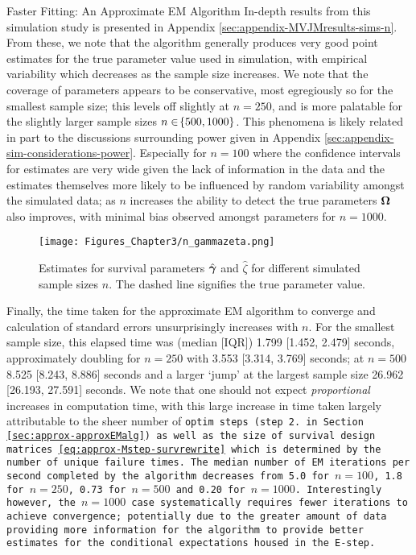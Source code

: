 \begin{chapter}{\label{cha:approx}Faster Fitting: An Approximate EM Algorithm}
  In-depth results from this simulation study is presented in Appendix \ref{sec:appendix-MVJMresults-sims-n}. From these, we note that the algorithm generally produces very good point estimates for the true parameter value used in simulation, with empirical variability which decreases as the sample size increases. We note that the coverage of parameters appears to be conservative, most egregiously so for the smallest sample size; this levels off slightly at $n=250$, and is more palatable for the slightly larger sample sizes $n\in\!\left\{500,1000\right\}$. This phenomena is likely related in part to the discussions surrounding power given in Appendix \ref{sec:appendix-sim-considerations-power}. Especially for $n=100$ where the confidence intervals for estimates are very wide given the lack of information in the data and the estimates themselves more likely to be influenced by random variability amongst the simulated data; as $n$ increases the ability to detect the true parameters $\bm{\mathrm{\Omega}}$ also improves, with minimal bias observed amongst parameters for $n=1000$.

  \begin{figure}[t]
      \centering
      \texttt{[image: Figures\_Chapter3/n\_gammazeta.png]}
      \caption{Estimates for survival parameters $\hat{\bm{\gamma}}$ and $\hat{\zeta}$ for different simulated sample sizes $n$. The dashed line signifies the true parameter value.}
      \label{fig:approx-sims-n}
  \end{figure}

  Finally, the time taken for the approximate EM algorithm to converge and calculation of standard errors unsurprisingly increases with $n$. For the smallest sample size, this elapsed time was (median [IQR]) 1.799 [1.452, 2.479] seconds, approximately doubling for $n=250$ with 3.553 [3.314, 3.769] seconds; at $n=500$ 8.525 [8.243, 8.886] seconds and a larger `jump' at the largest sample size 26.962 [26.193, 27.591] seconds. We note that one should not expect \textit{proportional} increases in computation time, with this large increase in time taken largely attributable to the sheer number of \tt{optim} steps (\ie step 2. in Section \ref{sec:approx-approxEMalg}) as well as the size of survival design matrices \eqref{eq:approx-Mstep-survrewrite} which is determined by the number of unique failure times. The median number of EM iterations per second completed by the algorithm decreases from 5.0 for $n=100$, 1.8 for $n=250$, 0.73 for $n=500$ and 0.20 for $n=1000$. Interestingly however, the $n=1000$ case systematically requires fewer iterations to achieve convergence; potentially due to the greater amount of data providing more information for the algorithm to provide better estimates for the conditional expectations housed in the E-step.
  

\end{chapter}
